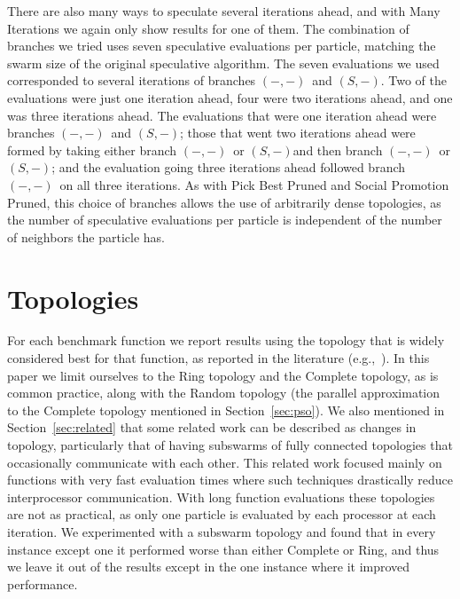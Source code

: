 \documentclass[ms,electronic,twosidetoc,letterpaper,chaptercenter,parttop,equalmargins]{byumsphd}
\renewcommand{\sec}[1]{Section~\ref{sec:#1}}
\providecommand{\casexn}{\ensuremath{(S,-)}}
\providecommand{\casepn}{\ensuremath{(-,-)}}
\begin{document}
There are also many ways to speculate several iterations ahead, and with Many
Iterations we again only show results for one of them.  The combination of
branches we tried uses seven speculative evaluations per particle, matching the
swarm size of the original speculative algorithm.  The seven evaluations we
used corresponded to several iterations of branches \casepn\ and \casexn.  Two
of the evaluations were just one iteration ahead, four were two iterations
ahead, and one was three iterations ahead.  The evaluations that were one
iteration ahead were branches \casepn\ and \casexn; those that went two
iterations ahead were formed by taking either branch \casepn\ or \casexn and
then branch \casepn\ or \casexn; and the evaluation going three iterations
ahead followed branch \casepn\ on all three iterations.  As with Pick Best
Pruned and Social Promotion Pruned, this choice of branches allows the use of
arbitrarily dense topologies, as the number of speculative evaluations per
particle is independent of the number of neighbors the particle has.

\section{Topologies}

For each benchmark function we report results using the topology that is widely
considered best for that function, as reported in the literature
(e.g.,~\cite{bratton-2007-defining-a-standard-for-pso}).  In this paper we
limit ourselves to the Ring topology and the Complete topology, as is common
practice, along with the Random topology (the parallel approximation to the
Complete topology mentioned in \sec{pso}).  We also mentioned in \sec{related}
that some related work can be described as changes in topology, particularly
that of having subswarms of fully connected topologies that occasionally
communicate with each other.  This related work focused mainly on functions
with very fast evaluation times where such techniques drastically reduce
interprocessor communication.  With long function evaluations these topologies
are not as practical, as only one particle is evaluated by each processor at
each iteration.  We experimented with a subswarm topology and found that in
every instance except one it performed worse than either Complete or Ring, and
thus we leave it out of the results except in the one instance where it
improved performance.
\end{document}
